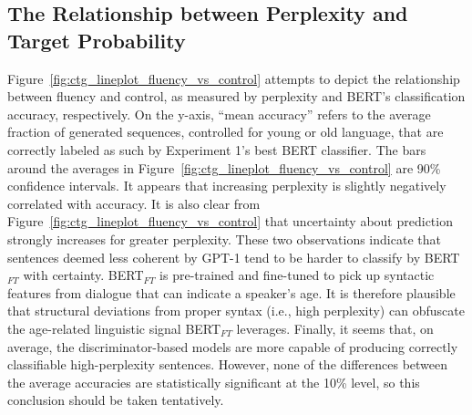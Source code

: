 
\subsection{The Relationship between Perplexity and Target Probability }

Figure~\ref{fig:ctg_lineplot_fluency_vs_control} attempts to depict the relationship between fluency and control, as measured by perplexity and BERT's classification accuracy, respectively. On the y-axis, ``mean accuracy'' refers to the average fraction of generated sequences, controlled for young or old language, that are correctly labeled as such by Experiment 1's best BERT classifier. The bars around the averages in Figure~\ref{fig:ctg_lineplot_fluency_vs_control} are 90\% confidence intervals.
It appears that increasing perplexity is slightly negatively correlated with accuracy. It is also clear from Figure~\ref{fig:ctg_lineplot_fluency_vs_control} that uncertainty about prediction strongly increases for greater perplexity. These two observations indicate that sentences deemed less coherent by GPT-1 tend to be harder to classify by BERT$_{FT}$ with certainty. BERT$_{FT}$ is pre-trained and fine-tuned to pick up syntactic features from dialogue that can indicate a speaker's age. It is therefore plausible that structural deviations from proper syntax (i.e., high perplexity) can obfuscate the age-related linguistic signal BERT$_{FT}$ leverages. Finally, it seems that, on average, the discriminator-based models are more capable of producing correctly classifiable high-perplexity sentences.  However, none of the differences between the average accuracies are statistically significant at the 10\% level, so this conclusion should be taken tentatively.

